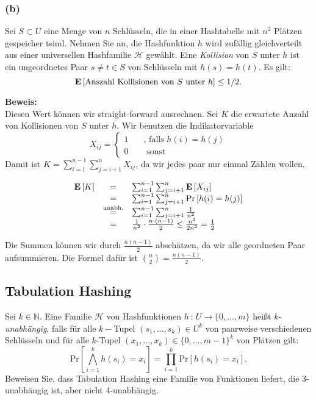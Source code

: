 \documentclass[11pt,a4paper,ngerman]{article}
\newcommand{\erw}[1]{\text{\bfseries E} \left[ #1 \right]}
\newcommand{\prob}[1]{\text{Pr}\left[ #1 \right]}
\begin{document}
\subsubsection*{(b)}
Sei $S \subset U$ eine Menge von $n$ Schlüsseln, die in einer Hashtabelle mit $n^2$ Plätzen gespeicher tsind. Nehmen Sie an, die Hashfunktion $h$ wird zufällig gleichverteilt aus einer universellen Hashfamilie $\mathcal{H}$ gewählt. Eine \emph{Kollision} von $S$ unter $h$ ist ein ungeordnetes Paar $s \not= t \in S$ von Schlüsseln mit $h(s) = h(t)$. Es gilt:
$$
	\erw{\text{Anszahl Kollisionen von }S\text{ unter }h} \leq 1 / 2 .
$$

\noindent\textbf{Beweis:}\\
Diesen Wert können wir straight-forward ausrechnen. Sei $K$ die erwartete Anzahl von Kollisionen von $S$ unter $h$.
Wir benutzen die Indikatorvariable
$$
	X_{ij} = \left\{ \begin{array}{rl} 1 \quad &\text{, falls }h(i) = h(j)\\ 0 &\text{ sonst} \end{array}\right.
$$
Damit ist $K = \sum_{i=1}^{n-1}\sum_{j=i+1}^n X_{ij}$, da wir jedes paar nur einmal Zählen wollen.

$$\begin{array}{rcl}
	\erw{K} &=& \sum_{i=1}^{n-1}\sum_{j=i+1}^n \erw{X_{ij}}\\
		&=& \sum_{i=1}^{n-1}\sum_{j=i+1}^n \prob{h(i)=h(j)}\\
		   &\stackrel{\text{unabh.}}{=}& \sum_{i=1}^{n-1} \sum_{j=i+1}^n \frac{1}{n^2}\\
		  &=& \frac{1}{n^2} \cdot \frac{n\cdot (n-1)}{2} \leq \frac{n^2}{2n^2} = \frac{1}{2}
\end{array}$$

Die Summen können wir durch $\frac{n(n-1)}{2}$ abschätzen, da wir alle geordneten Paar aufsummieren.
Die Formel dafür ist $\binom{n}{2} = \frac{n(n-1)}{2}$.

\subsection*{Tabulation Hashing}
Sei $k \in \mathbb{N}$. Eine Familie $\mathcal{H}$ von Hashfunktionen $h \, : \, U \rightarrow \{ 0, \ldots, m\}$ heißt $k$-\emph{unabhängig}, falls für alle $k-$Tupel $(s_1,\ldots, s_k) \in U^k$ von paarweise verschiedenen Schlüsseln und für alle $k$-Tupel $(x_1, \ldots, x_k) \in \{0, \ldots, m-1\}^k$ von Plätzen gilt:
$$
	\prob{\bigwedge_{i=1}^k h(s_i) = x_i} = \prod_{i=1}^k \prob{h(s_i) = x_i}.
$$
Beweisen Sie, dass Tabulation Hashing eine Familie von Funktionen liefert, die 3-unabhängig ist, aber nicht 4-unabhängig.\\
\end{document}

